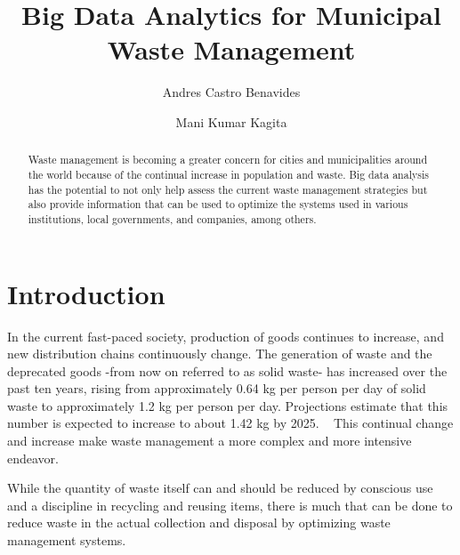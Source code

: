 \documentclass[sigconf]{acmart}
\begin{document}
\title{Big Data Analytics for Municipal Waste Management}

\author{Andres Castro Benavides}

\author{Mani Kumar Kagita}
\renewcommand{\shortauthors}{A. Castro et al.}

\begin{abstract}
Waste management is becoming a greater concern for cities and municipalities around the world because of the continual increase in  population and waste. Big data analysis has the potential to not only help assess the current waste management strategies but also provide information that can be used to optimize the systems used in various institutions, local governments, and companies, among others.
\end{abstract}


\maketitle

\section{Introduction}

In the current fast-paced society,  production of goods continues to increase, and new distribution chains continuously change. The generation of waste and the deprecated goods -from now on referred to as solid waste- has increased over the past ten years, rising from approximately 0.64 kg per person per day of solid waste to approximately 1.2 kg per person per day.  Projections estimate that this number is expected to increase to about 1.42 kg by 2025.
~\cite{hoornweg2012} This continual change and increase make waste management a more complex and more intensive endeavor.  

While the quantity of waste itself can and should be reduced by conscious use and a discipline in recycling and reusing items, there is much that can be done to reduce waste in the actual collection and disposal by optimizing waste management systems.
\end{document}
